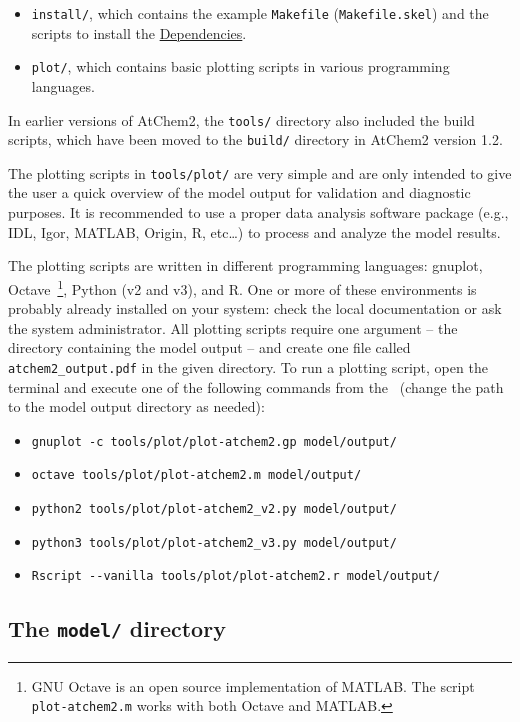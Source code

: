 \begin{itemize}
\item \texttt{install/}, which contains the example \texttt{Makefile}
  (\texttt{Makefile.skel}) and the scripts to install the
  \hyperref[sec:dependencies]{Dependencies}.
\item \texttt{plot/}, which contains basic plotting scripts in various
  programming languages.
\end{itemize}

In earlier versions of AtChem2, the \texttt{tools/} directory also
included the build scripts, which have been moved to the
\texttt{build/} directory in AtChem2 version 1.2.

The plotting scripts in \texttt{tools/plot/} are very simple and are
only intended to give the user a quick overview of the model output
for validation and diagnostic purposes. It is recommended to use a
proper data analysis software package (e.g., IDL, Igor, MATLAB,
Origin, R, etc\ldots) to process and analyze the model results.

The plotting scripts are written in different programming languages:
gnuplot, Octave~\footnote{GNU Octave is an open source implementation
  of MATLAB. The script \texttt{plot-atchem2.m} works with both Octave
  and MATLAB.}, Python (v2 and v3), and R. One or more of these
environments is probably already installed on your system: check the
local documentation or ask the system administrator. All plotting
scripts require one argument -- the directory containing the model
output -- and create one file called \texttt{atchem2\_output.pdf} in
the given directory. To run a plotting script, open the terminal and
execute one of the following commands from the \maindir\ (change the
path to the model output directory as needed):

\begin{itemize}
\item \verb|gnuplot -c tools/plot/plot-atchem2.gp model/output/|
\item \verb|octave tools/plot/plot-atchem2.m model/output/|
\item \verb|python2 tools/plot/plot-atchem2_v2.py model/output/|
\item \verb|python3 tools/plot/plot-atchem2_v3.py model/output/|
\item \verb|Rscript --vanilla tools/plot/plot-atchem2.r model/output/|
\end{itemize}

\subsection{The \texttt{model/} directory} \label{subsec:model-directory}

